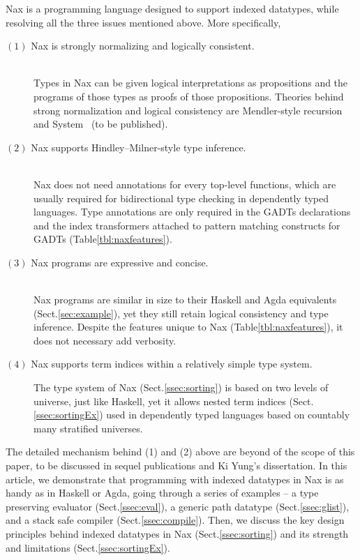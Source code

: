 Nax is a programming language designed to support indexed datatypes,
while resolving all the three issues mentioned above.
More specifically,
\begin{description}
\item[$(1)$ Nax is strongly normalizing and logically consistent.]~\\
Types in Nax can be given logical interpretations as propositions
and the programs of those types as proofs of those propositions.
Theories behind strong normalization and logical consistency are
Mendler-style recursion \cite{AhnShe11} and System \Fi\ (to be published).

\item[$(2)$ Nax supports Hindley--Milner-style type inference.]~\\
Nax does not need annotations for every top-level functions, which are usually
required for bidirectional type checking in dependently typed languages.
Type annotations are only required in the GADTs declarations and
the index transformers attached to pattern matching constructs for GADTs
(Table\;\ref{tbl:naxfeatures}).

\item[$(3)$ Nax programs are expressive and concise.]~\\
Nax programs are similar in size to their Haskell and Agda equivalents
(Sect.\;\ref{sec:example}), yet they still retain logical consistency
and type inference. Despite the features unique to Nax
(Table\;\ref{tbl:naxfeatures}), it does not necessary add verbosity.

\item[$(4)$ Nax supports term indices within a relatively simple type system.]
The type system of Nax (Sect.\;\ref{ssec:sorting}) is based on
two levels of universe, just like Haskell, yet it allows nested term indices
(Sect.\;\ref{ssec:sortingEx}) used in dependently typed languages based on
countably many stratified universes.
\end{description}
The detailed mechanism behind (1) and (2) above are beyond of the scope of
this paper, to be discussed in sequel publications and Ki Yung's dissertation.
In this article, we demonstrate that programming with indexed datatypes in Nax
is as handy as in Haskell or Agda, going through a series of examples --
a type preserving evaluator (Sect.\;\ref{ssec:eval}),
a generic path datatype (Sect.\;\ref{ssec:glist}), and
a stack safe compiler (Sect.\;\ref{ssec:compile}).
Then, we discuss the key design principles behind indexed datatypes in Nax
(Sect.\;\ref{ssec:sorting}) and its strength and limitations
(Sect.\;\ref{ssec:sortingEx}).

